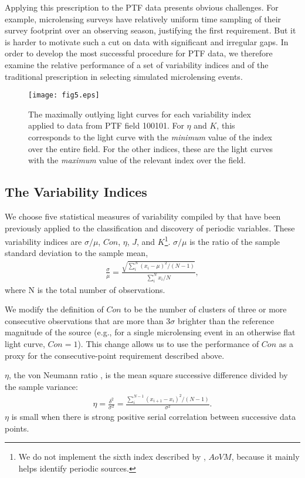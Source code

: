 \documentclass{emulateapj}
\begin{document}
Applying this prescription to the PTF data presents obvious challenges. For example, microlensing surveys have relatively uniform time sampling of their survey footprint over an observing season, justifying the first requirement. But it is harder to motivate such a cut on data with significant and irregular gaps. In order to develop the most successful procedure for PTF data, we therefore examine the relative performance of a set of variability indices and of the traditional prescription in selecting simulated microlensing events.

\begin{figure}[h]
\centering\texttt{[image: fig5.eps]}
\caption{The maximally outlying light curves for each variability index applied to data from PTF field 100101. For $\eta$ and $K$, this corresponds to the light curve with the \emph{minimum} value of the index over the entire field. For the other indices, these are the light curves with the \emph{maximum} value of the relevant index over the field. } \label{fig:indices_examples}
\end{figure}

\subsection{The Variability Indices} 
We choose five statistical measures of variability compiled by \cite{shin2009} that have been previously applied to the classification and discovery of periodic variables. These variability indices are $\sigma/\mu$, $Con$, $\eta$, $J$, and $K$\footnote{We do not implement the sixth index described by \cite{shin2009}, $AoVM$, because it mainly helps identify periodic sources.}. $\sigma/\mu$ is the ratio of the sample standard deviation to the sample mean, 
\begin{align}
	\frac{\sigma}{\mu} = \frac{\sqrt{\sum^N_i (x_i - \mu)^2 / (N-1)}}{\sum^N_i x_i/N},
\end{align}
where N is the total number of observations. 

We modify the definition of $Con$ to be the number of clusters of three or more consecutive observations that are more than $3\sigma$ brighter than the reference magnitude of the source (e.g., for a single microlensing event in an otherwise flat light curve, $Con=1$). This change allows us to use the performance of $Con$ as a proxy for the consecutive-point requirement described above. 

$\eta$, the von Neumann ratio \citep{von_neumann1941}, is the mean square successive difference divided by the sample variance:
\begin{align}
	\eta = \frac{\delta^2}{\sigma^2} = \frac{\sum^{N-1}_i(x_{i+1} - x_i)^2/(N-1)}{\sigma^2}.
\end{align}
$\eta$ is small when there is strong positive serial correlation between successive data points. 
\end{document}
